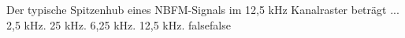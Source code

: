     {Der typische Spitzenhub eines NBFM-Signals im 12,5 kHz Kanalraster beträgt ...}
    {2,5 kHz.}
    {25 kHz.}
    {6,25 kHz.}
    {12,5 kHz.}
    {false}{false}